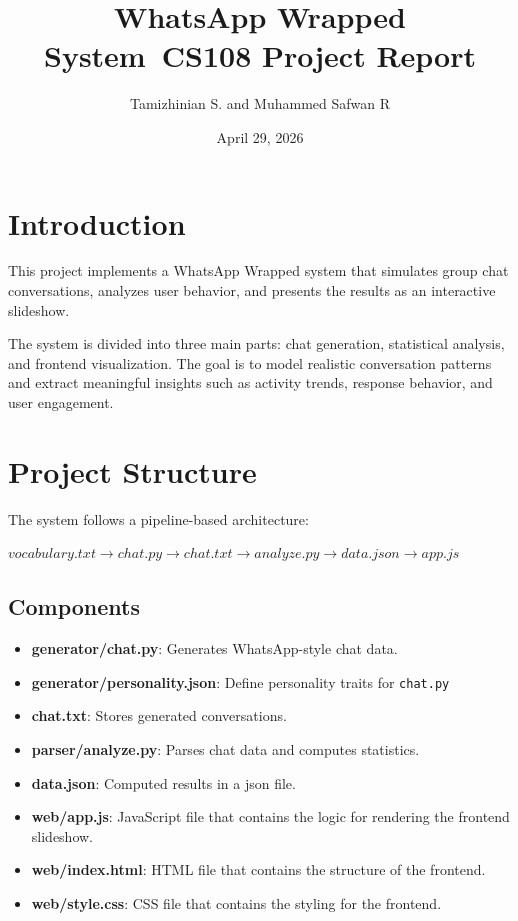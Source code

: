 \documentclass[12pt]{article}
\title{WhatsApp Wrapped System\
CS108 Project Report}
\author{Tamizhinian S. and Muhammed Safwan R}
\date{April 29, 2026}
\begin{document}
\maketitle
\tableofcontents

\section{Introduction}

This project implements a WhatsApp Wrapped system that simulates group chat conversations, analyzes user behavior, and presents the results as an interactive slideshow.

The system is divided into three main parts: chat generation, statistical analysis, and frontend visualization. The goal is to model realistic conversation patterns and extract meaningful insights such as activity trends, response behavior, and user engagement.


\section{Project Structure}

The system follows a pipeline-based architecture:

\begin{math}
vocabulary.txt \rightarrow chat.py \rightarrow chat.txt \rightarrow analyze.py \rightarrow data.json \rightarrow app.js
\end{math}

\subsection{Components}

\begin{itemize}
\item \textbf{generator/chat.py}: Generates WhatsApp-style chat data.
\item \textbf{generator/personality.json}: Define personality traits for \texttt{chat.py}
\item \textbf{chat.txt}: Stores generated conversations.
\item \textbf{parser/analyze.py}: Parses chat data and computes statistics.
\item \textbf{data.json}: Computed results in a json file.
\item \textbf{web/app.js}: JavaScript file that contains the logic for rendering the frontend slideshow.
\item \textbf{web/index.html}: HTML file that contains the structure of the frontend.
\item \textbf{web/style.css}: CSS file that contains the styling for the frontend.
\end{itemize}
\end{document}
